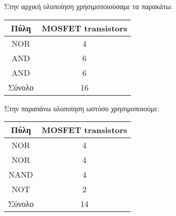 \documentclass[]{article}
\begin{document}
Στην αρχική υλοποίηση χρησιμοποιούσαμε τα παρακάτω:
\begin{center}
	\begin{tabular} { | c | c | }
		\hline Πύλη   & MOSFET transistors \\
		\hline NOR    & 4                  \\
		AND           & 6                  \\
		AND           & 6                  \\
		\hline Σύνολο & 16                 \\
		\hline
	\end{tabular}
\end{center}

Στην παραπάνω υλοποίηση ωστόσο χρησιμοποιούμε:


\begin{center}
	\begin{tabular} { | c | c | }
		\hline Πύλη   & MOSFET transistors \\
		\hline NOR    & 4                  \\
		NOR           & 4                  \\
		NAND          & 4                  \\
		NOT           & 2                  \\
		\hline Σύνολο & 14                 \\
		\hline
	\end{tabular}
\end{center}
\end{document}
